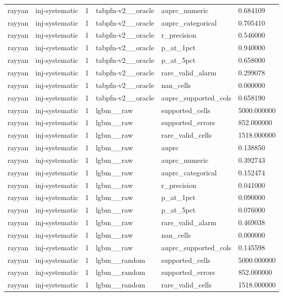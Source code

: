 \begin{tabular}{llllll}
rayyan & inj-systematic & 1 & tabpfn-v2\_\_oracle & auprc\_numeric & 0.684109 \\
rayyan & inj-systematic & 1 & tabpfn-v2\_\_oracle & auprc\_categorical & 0.705410 \\
rayyan & inj-systematic & 1 & tabpfn-v2\_\_oracle & r\_precision & 0.546000 \\
rayyan & inj-systematic & 1 & tabpfn-v2\_\_oracle & p\_at\_1pct & 0.940000 \\
rayyan & inj-systematic & 1 & tabpfn-v2\_\_oracle & p\_at\_5pct & 0.658000 \\
rayyan & inj-systematic & 1 & tabpfn-v2\_\_oracle & rare\_valid\_alarm & 0.299078 \\
rayyan & inj-systematic & 1 & tabpfn-v2\_\_oracle & nan\_cells & 0.000000 \\
rayyan & inj-systematic & 1 & tabpfn-v2\_\_oracle & auprc\_supported\_cols & 0.658190 \\
rayyan & inj-systematic & 1 & lgbm\_\_raw & supported\_cells & 5000.000000 \\
rayyan & inj-systematic & 1 & lgbm\_\_raw & supported\_errors & 852.000000 \\
rayyan & inj-systematic & 1 & lgbm\_\_raw & rare\_valid\_cells & 1518.000000 \\
rayyan & inj-systematic & 1 & lgbm\_\_raw & auprc & 0.138850 \\
rayyan & inj-systematic & 1 & lgbm\_\_raw & auprc\_numeric & 0.392743 \\
rayyan & inj-systematic & 1 & lgbm\_\_raw & auprc\_categorical & 0.152474 \\
rayyan & inj-systematic & 1 & lgbm\_\_raw & r\_precision & 0.041000 \\
rayyan & inj-systematic & 1 & lgbm\_\_raw & p\_at\_1pct & 0.090000 \\
rayyan & inj-systematic & 1 & lgbm\_\_raw & p\_at\_5pct & 0.076000 \\
rayyan & inj-systematic & 1 & lgbm\_\_raw & rare\_valid\_alarm & 0.469038 \\
rayyan & inj-systematic & 1 & lgbm\_\_raw & nan\_cells & 0.000000 \\
rayyan & inj-systematic & 1 & lgbm\_\_raw & auprc\_supported\_cols & 0.145598 \\
rayyan & inj-systematic & 1 & lgbm\_\_random & supported\_cells & 5000.000000 \\
rayyan & inj-systematic & 1 & lgbm\_\_random & supported\_errors & 852.000000 \\
rayyan & inj-systematic & 1 & lgbm\_\_random & rare\_valid\_cells & 1518.000000 \\

\end{tabular}
